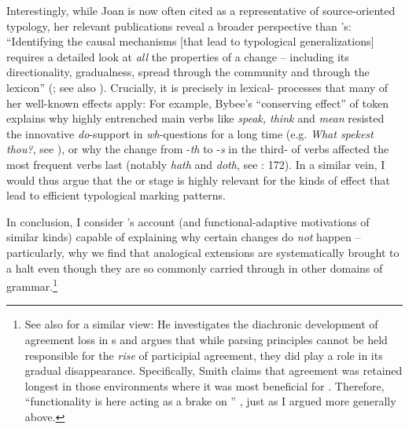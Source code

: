 \documentclass[output=paper]{langsci/langscibook}
\begin{document}
Interestingly, while Joan  is now often cited as a representative of source-oriented typology, her relevant publications reveal a broader perspective than ’s: “Identifying the causal mechanisms [that lead to typological generalizations] requires a detailed look at \textit{all} the properties of a change – including its directionality, gradualness, spread through the community and through the lexicon” (\citealt[108]{Bybee2008_StructPres}; see also \citealt{Bybee1988_Diachr}). Crucially, it is precisely in lexical- processes that many of her well-known  effects apply: For example, Bybee’s “conserving effect” of token  explains why highly entrenched main verbs like \textit{speak, think} and \textit{mean} resisted the innovative \textit{do}{}-support in \textit{wh}{}-questions for a long time (e.g. \textit{What spekest thou?}, see \citealt{Ogura1993_do}), or why the change from -\textit{th} to -\textit{s} in the third- of  verbs affected the most frequent verbs last (notably \textit{hath} and \textit{doth}, see \citealt{Gelderen2014_Hist}: 172). In a similar vein, I would thus argue that the  or  stage is highly relevant for the kinds of effect that lead to efficient typological marking patterns. 

In conclusion, I consider ’s account (and functional-adaptive motivations of similar kinds) capable of explaining why certain changes do \textit{not} happen – particularly, why we find that analogical extensions are systematically brought to a halt even though they are so commonly carried through in other domains of grammar.\footnote{See also \citet{Smith2001_Act} for a similar view: He investigates the diachronic development of agreement loss in  s and argues that while parsing principles cannot be held responsible for the \textit{rise} of participial agreement, they did play a role in its gradual disappearance. Specifically, Smith claims that agreement was retained longest in those environments where it was most beneficial for . Therefore, “functionality is here acting as a brake on ” \citep[214]{Smith2001_Act}, just as I argued more generally above.}
\end{document}
